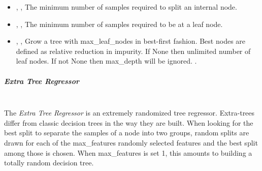 \begin{itemize}
{      field},
  The maximum depth of the tree.
  If None, then nodes are expanded until all leaves are pure or until all leaves
  contain less than min\_samples\_split samples.
  Ignored if max\_samples\_leaf is not None.
  \item {} , ,
  The minimum number of samples required to split an internal node.
  \item {} , ,
  The minimum number of samples required to be at a leaf node.
  \item {} , ,
  Grow a tree with max\_leaf\_nodes in best-first fashion.
  Best nodes are defined as relative reduction in impurity.
  If None then unlimited number of leaf nodes.
  If not None then max\_depth will be ignored.
  .
\end{itemize}
\subparagraph{Extra Tree Regressor}
\mbox{}
\\The \textit{Extra Tree Regressor} is an extremely randomized tree regressor.
%
Extra-trees differ from classic decision trees in the way they are built.
%
When looking for the best split to separate the samples of a node into two
groups, random splits are drawn for each of the max\_features randomly selected
features and the best split among those is chosen.
%
When max\_features is set 1, this amounts to building a totally random decision
tree.
%
